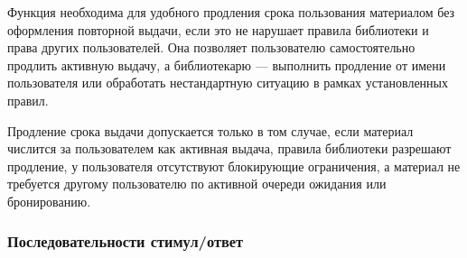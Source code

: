 \documentclass[12pt,a4paper]{article}
\begin{document}
	Функция необходима для удобного продления срока пользования материалом без
	оформления повторной выдачи, если это не нарушает правила библиотеки и права
	других пользователей. Она позволяет пользователю самостоятельно продлить активную
	выдачу, а библиотекарю — выполнить продление от имени пользователя или обработать
	нестандартную ситуацию в рамках установленных правил.
	
	Продление срока выдачи допускается только в том случае, если материал числится
	за пользователем как активная выдача, правила библиотеки разрешают продление,
	у пользователя отсутствуют блокирующие ограничения, а материал не требуется
	другому пользователю по активной очереди ожидания или бронированию.
	
	\subsubsection{Последовательности стимул/ответ}
	
\end{document}
